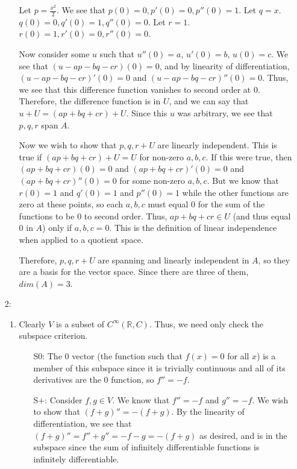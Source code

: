 \documentclass[12pt]{article}
\newcommand{\R}{\mathbb{R}}
\begin{document}
\begin{enumerate}
\begin{enumerate}
    Let $p = \frac{x^2}{2}$. We see that $p(0) = 0, p'(0) = 0, p''(0) = 1$. Let $q = x$. $q(0) = 0, q'(0) = 1, q''(0) = 0$. Let $r = 1$. $r(0) = 1, r'(0) = 0, r''(0) = 0$. 

    Now consider some $u$ such that $u''(0) = a$, $u'(0) = b$, $u(0) = c$. We see that $(u - ap - bq - cr)(0) = 0$, and by linearity of differentiation, $(u - ap - bq - cr)'(0) = 0$ and $(u - ap - bq - cr)''(0) = 0$. Thus, we see that this difference function vanishes to second order at $0$. Therefore, the difference function is in $U$, and we can say that $u + U = (ap + bq + cr) + U$. Since this $u$ was arbitrary, we see that $p, q, r$ span $A$.

    Now we wish to show that $p, q, r + U$ are linearly independent. This is true if $(ap + bq + cr) + U = U$ for non-zero $a, b, c$. If this were true, then $(ap + bq + cr)(0) = 0$ and $(ap + bq + cr)'(0) = 0$ and $(ap + bq + cr)''(0) = 0$ for some non-zero $a, b, c$. But we know that $r(0) = 1$ and $q'(0) = 1$ and $p''(0) = 1$ while the other functions are zero at these points, so each $a, b, c$ must equal $0$ for the sum of the functions to be $0$ to second order. Thus, $ap + bq + cr \in U$ (and thus equal $0$ in $A$) only if $a, b, c = 0$. This is the definition of linear independence when applied to a quotient space.

    Therefore, $p, q, r + U$ are spanning and linearly independent in $A$, so they are a basis for the vector space. Since there are three of them, $dim(A) = 3$.

  \end{enumerate}

\item[2:]
  \begin{enumerate}
  \item
    Clearly $V$ is a subset of $C^{\infty}(\R, C)$. Thus, we need only check the subspace criterion.

    \begin{enumerate}
      \item[S$0$:]
        The $0$ vector (the function such that $f(x) = 0$ for all $x$) is a member of this subspace since it is trivially continuous and all of its derivatives are the $0$ function, so $f'' = -f$.

      \item[S$+$:]
        Consider $f, g \in V$. We know that $f'' = -f$ and $g'' = -f$. We wish to show that $(f + g)'' = -(f + g)$. By the linearity of differentiation, we see that $(f + g)'' = f'' + g'' = -f -g = -(f + g)$ as desired, and is in the subspace since the sum of infinitely differentiable functions is infinitely differentiable.


\end{enumerate}
\end{enumerate}
\end{enumerate}
\end{document}
